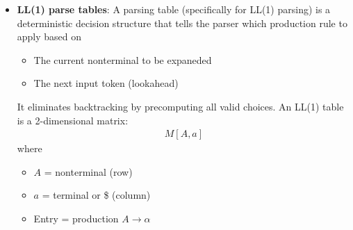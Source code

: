 \documentclass{report}
\begin{document}
\begin{itemize}
\begin{enumerate}
                \item If $a \in \text{FIRST}(\alpha_{i}) $, choose the production $\alpha_{i}$, otherwise
                \item If $\varepsilon \in \text{FIRST}(\alpha_{k})$, and $a \in \text{FOLLOW}(A)$, choose $\alpha_{k}$,
                \item Otherwise, syntax error.
            \end{enumerate}
            Note that
            \begin{align*}
                \varepsilon \in \text{FIRST}(\alpha_{k}) \iff a_{k} \Rightarrow^{*}\; \varepsilon
            .\end{align*}
            So, given our current lookahead token, we choose a production from the selection rules above. But, does this action consume the token? No. A token is consumed only if the top of the stack contains only a terminal that matches the token. For example, if our current token is $a$, with token type \texttt{var}, and we choose a production $S \to \text{var}$. Then, we consume the token. This consumption should then be visible to all other calls in the call stack. In other words, the lookahead should be global, not local to any particular rule.
            \bigbreak \noindent 
            In the case of actually building the AST, we should return a node if we consumed a token.
            \bigbreak \noindent 
            Consider the expression $a + b$, the parse tree is generated implicitly by the call tree, and the AST is generated explicitly through returned nodes.
            \bigbreak \noindent 
        \item  \textbf{LL(1) parse tables}: A parsing table (specifically for LL(1) parsing) is a deterministic decision structure that tells the parser which production rule to apply based on
            \begin{itemize}
                \item The current nonterminal to be expaneded
                \item The next input token (lookahead)
            \end{itemize}
            It eliminates backtracking by precomputing all valid choices.
            \bigbreak \noindent 
            An LL(1) table is a 2-dimensional matrix:
            \begin{align*}
                M[A,a]
            \end{align*}
            where 
            \begin{itemize}
                \item $A$ = nonterminal (row)
                \item $a$ = terminal or \$ (column)
                \item Entry = production $A \to \alpha$
            \end{itemize}
    \end{itemize}
\end{document}
